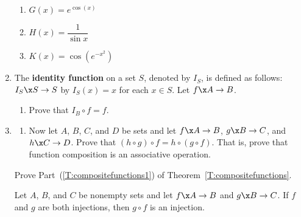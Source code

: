 \begin{enumerate}
\begin{multicols}{2}
\begin{enumerate}
\item $G( x ) = e^{\cos ( x )} $

\item $H( x ) = \dfrac{1}{{\sin x}}$

\item $K( x ) = \cos \!\left( {e^{ - x^2 } } \right)$
\end{enumerate}
\end{multicols}


\item The \textbf{identity function}
%
 on a set  $S$, denoted by $I_S$,  is defined as follows: \linebreak  $I_S \x S \to S$ by  $I_S ( x ) = x$
for each  $x \in S$. \label{exer:sec64-4}  Let  $f\x A \to B$.

\begin{enumerate}
\yitem For each  $x \in A$, determine   $( {f \circ I_A } )( x )$ and use this to prove that  $f \circ I_A  = f$.

\item Prove that  $I_B  \circ f = f$\!.
\end{enumerate}


\item \label{exer:sec64-3} \begin{enumerate} 
\yitem Let  $f\x \mathbb{R} \to \mathbb{R}$ be defined by  
$f( x ) = x^2 $,  let $g\x \mathbb{R} \to \mathbb{R}$ be defined by  
$g( x ) = \sin x$, and let $h\x \mathbb{R} \to \mathbb{R}$ be defined by  
$h( x ) = \sqrt[3]{x}$.  
\vskip10pt
Determine formulas for    $\left[ ( {h \circ g} ) \circ f \right] ( x )$ and  $\left[ h \circ ( {g \circ f} ) \right] ( x )$.  
\vskip10pt
Does this prove that  $( {h \circ g} ) \circ f = h \circ ( {g \circ f} )$
for these particular functions?  Explain.

\item Now let $A$, $B$, $C$, and $D$ be sets and let  $f\x A \to B$,  $g\x B \to C$,  and  $h\x C \to D$.  Prove that  
$( {h \circ g} ) \circ f = h \circ ( {g \circ f} )$.  That is, prove that function composition is an associative operation.
\end{enumerate}


\xitem Prove Part~(\ref{T:compositefunctions1}) of Theorem~\ref{T:compositefunctions}.
\label{exer:compositefunctions1}

Let  $A$, $B$, and  $C$  be nonempty sets and let  $f\x A \to B$  and  $g\x B \to C$.  If  $f$  and  $g$  are both injections, then  $g \circ f$  is an injection. \label{exer:sec64-5}



\end{enumerate}
